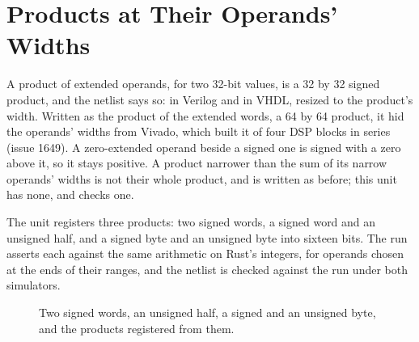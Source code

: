 \section{Products at Their Operands' Widths}
\label{sec:x-smul}

A product of extended operands, 
for two 32-bit values, is a 32 by 32 signed product, and the netlist
says so:  in Verilog and
 in VHDL, resized to the product's width.
Written as the product of the extended words, a 64 by 64 product,
it hid the operands' widths from Vivado, which built it of four DSP
blocks in series (issue 1649). A zero-extended operand beside a signed
one is signed with a zero above it, so it stays positive. A product
narrower than the sum of its narrow operands' widths is not their whole
product, and is written as before; this unit has none, and
 checks one.

The unit registers three products: two signed words, a signed word and
an unsigned half, and a signed byte and an unsigned byte into sixteen
bits. The run asserts each against the
same arithmetic on Rust's integers, for operands chosen at the ends of
their ranges, and the netlist is checked against the run under both
simulators.

\begin{figure}[htbp]
\centering

\caption{Two signed words, an unsigned half, a signed and an unsigned
byte, and the products registered from them.}
\label{fig:x-smul}
\end{figure}




